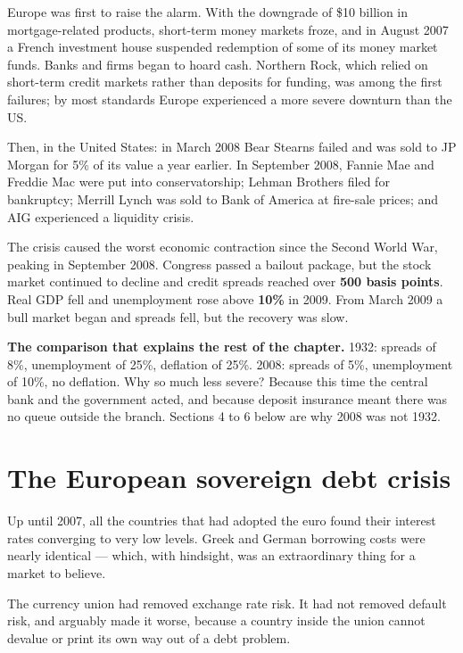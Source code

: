 \documentclass[11pt,a4paper]{article}
\newcommand{\keylab}[1]{\textcolor{ifclay}{\textbf{#1}}}
\begin{document}
Europe was first to raise the alarm. With the downgrade of \$10 billion in
mortgage-related products, short-term money markets froze, and in August 2007 a
French investment house suspended redemption of some of its money market funds.
Banks and firms began to hoard cash. Northern Rock, which relied on short-term
credit markets rather than deposits for funding, was among the first failures;
by most standards Europe experienced a more severe downturn than the US.

Then, in the United States: in March 2008 Bear Stearns failed and was sold to JP
Morgan for 5\% of its value a year earlier. In September 2008, Fannie Mae and
Freddie Mac were put into conservatorship; Lehman Brothers filed for bankruptcy;
Merrill Lynch was sold to Bank of America at fire-sale prices; and AIG
experienced a liquidity crisis.

The crisis caused the worst economic contraction since the Second World War,
peaking in September 2008. Congress passed a bailout package, but the stock
market continued to decline and credit spreads reached over \textbf{500 basis
points}. Real GDP fell and unemployment rose above \textbf{10\%} in 2009. From
March 2009 a bull market began and spreads fell, but the recovery was slow.

\begin{keybox}
\keylab{The comparison that explains the rest of the chapter.} 1932: spreads of
8\%, unemployment of 25\%, deflation of 25\%. 2008: spreads of 5\%, unemployment
of 10\%, no deflation. Why so much less severe? Because this time the central
bank and the government acted, and because deposit insurance meant there was no
queue outside the branch. Sections 4 to 6 below are why 2008 was not 1932.
\end{keybox}

\section{The European sovereign debt crisis}

Up until 2007, all the countries that had adopted the euro found their interest
rates converging to very low levels. Greek and German borrowing costs were
nearly identical --- which, with hindsight, was an extraordinary thing for a
market to believe.

The currency union had removed exchange rate risk. It had not removed default
risk, and arguably made it worse, because a country inside the union cannot
devalue or print its own way out of a debt problem.
\end{document}

